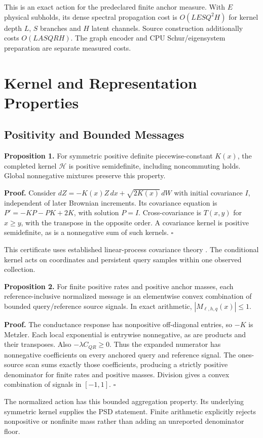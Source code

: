 \documentclass[letterpaper]{article}
\begin{document}
This is an exact action for the predeclared finite anchor measure. With $E$ physical subholds, its dense spectral propagation cost is $O(LESQ^2H)$ for kernel depth $L$, $S$ branches and $H$ latent channels. Source construction additionally costs $O(LASQRH)$. The graph encoder and CPU Schur/eigensystem preparation are separate measured costs.


\section{Kernel and Representation Properties}
\subsection{Positivity and Bounded Messages}
\textbf{Proposition 1.}
For symmetric positive definite piecewise-constant $K(x)$, the completed kernel $\mathcal H$ is positive semidefinite, including noncommuting holds. Global nonnegative mixtures preserve this property.

\textbf{Proof.}
Consider $dZ=-K(x)Z\,dx+\sqrt{2K(x)}\,dW$ with initial covariance $I$, independent of later Brownian increments. Its covariance equation is $P'=-KP-PK+2K$, with solution $P=I$. Cross-covariance is $T(x,y)$ for $x\geq y$, with the transpose in the opposite order. A covariance kernel is positive semidefinite, as is a nonnegative sum of such kernels. $\square$

This certificate uses established linear-process covariance theory \citep{sdes2019}. The conditional kernel acts on coordinates and persistent query samples within one observed collection.

\textbf{Proposition 2.}
For finite positive rates and positive anchor masses, each reference-inclusive normalized message is an elementwise convex combination of bounded query/reference source signals. In exact arithmetic, $|M_{\ell,h,q}(x)|\leq1$.

\textbf{Proof.}
The conductance response has nonpositive off-diagonal entries, so $-K$ is Metzler. Each local exponential is entrywise nonnegative, as are products and their transposes. Also $-\lambda C_{QR}\geq0$. Thus the expanded numerator has nonnegative coefficients on every anchored query and reference signal. The ones-source scan sums exactly those coefficients, producing a strictly positive denominator for finite rates and positive masses. Division gives a convex combination of signals in $[-1,1]$. $\square$

The normalized action has this bounded aggregation property. Its underlying symmetric kernel supplies the PSD statement. Finite arithmetic explicitly rejects nonpositive or nonfinite mass rather than adding an unreported denominator floor.
\end{document}
